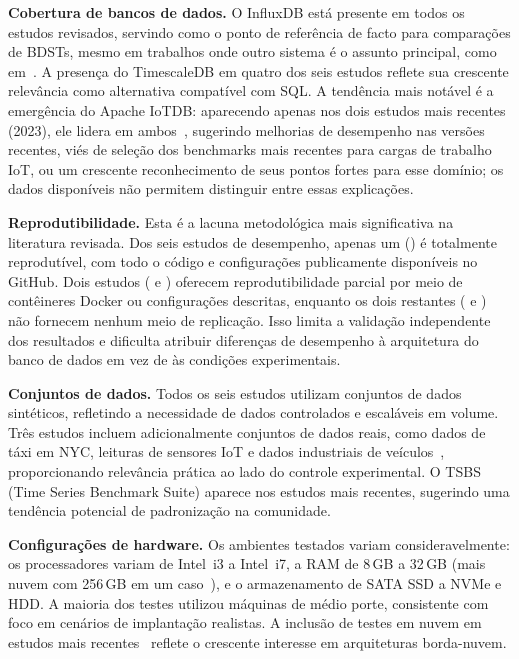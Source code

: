 \textbf{Cobertura de bancos de dados.} O InfluxDB está presente em todos os estudos revisados,
servindo como o ponto de referência de facto para comparações de BDSTs, mesmo em trabalhos
onde outro sistema é o assunto principal, como em~\cite{wang2023iotdb}. A presença do
TimescaleDB em quatro dos seis estudos reflete sua crescente relevância como alternativa
compatível com SQL. A tendência mais notável é a emergência do Apache IoTDB: aparecendo apenas
nos dois estudos mais recentes (2023), ele lidera em ambos~\citep{pereira2023mulletbench,wang2023iotdb},
sugerindo melhorias de desempenho nas versões recentes, viés de seleção dos benchmarks
mais recentes para cargas de trabalho IoT, ou um crescente reconhecimento de seus pontos
fortes para esse domínio; os dados disponíveis não permitem distinguir entre essas
explicações.

\textbf{Reprodutibilidade.} Esta é a lacuna metodológica mais significativa na literatura
revisada. Dos seis estudos de desempenho, apenas um (\cite{pereira2023mulletbench})
é totalmente reprodutível, com todo o código e configurações publicamente disponíveis no GitHub.
Dois estudos (\cite{lima2024avaliando} e \cite{wang2023iotdb}) oferecem reprodutibilidade
parcial por meio de contêineres Docker ou configurações descritas, enquanto os dois restantes
(\cite{shah2022performance} e \cite{naqvi2017influxdb}) não fornecem nenhum meio de replicação.
Isso limita a validação independente dos resultados e dificulta atribuir diferenças de
desempenho à arquitetura do banco de dados em vez de às condições experimentais.

\textbf{Conjuntos de dados.} Todos os seis estudos utilizam conjuntos de dados sintéticos,
refletindo a necessidade de dados controlados e escaláveis em volume. Três estudos incluem
adicionalmente conjuntos de dados reais, como dados de táxi em NYC, leituras de sensores IoT e
dados industriais de veículos~\citep{shah2022performance,naqvi2017influxdb,wang2023iotdb},
proporcionando relevância prática ao lado do controle experimental. O TSBS (Time Series
Benchmark Suite) aparece nos estudos mais recentes, sugerindo uma tendência potencial de
padronização na comunidade.

\textbf{Configurações de hardware.} Os ambientes testados variam consideravelmente: os
processadores variam de Intel~i3 a Intel~i7, a RAM de 8\,GB a 32\,GB (mais nuvem com 256\,GB
em um caso~\citep{wang2023iotdb}), e o armazenamento de SATA SSD a NVMe e HDD. A maioria dos
testes utilizou máquinas de médio porte, consistente com foco em cenários de implantação
realistas. A inclusão de testes em nuvem em estudos mais recentes~\citep{pereira2023mulletbench,wang2023iotdb}
reflete o crescente interesse em arquiteturas borda-nuvem.

